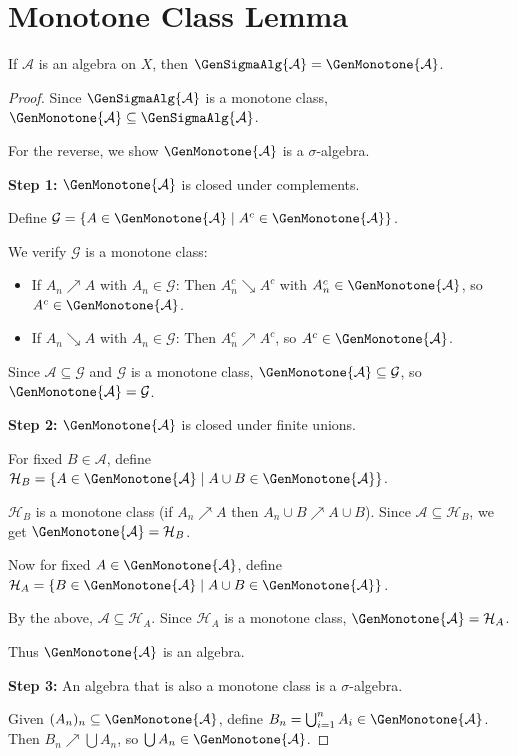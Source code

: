\section{Monotone Class Lemma}

\begin{theorem}
If $\mathcal{A}$ is an algebra on $X$, then $\GenSigmaAlg{\mathcal{A}} = \GenMonotone{\mathcal{A}}$.
\end{theorem}

\begin{proof}
Since $\GenSigmaAlg{\mathcal{A}}$ is a monotone class, $\GenMonotone{\mathcal{A}} \subseteq \GenSigmaAlg{\mathcal{A}}$.

For the reverse, we show $\GenMonotone{\mathcal{A}}$ is a $\sigma$-algebra.

\textbf{Step 1:} $\GenMonotone{\mathcal{A}}$ is closed under complements.

Define $\mathcal{G} = \{A \in \GenMonotone{\mathcal{A}} \mid A^c \in \GenMonotone{\mathcal{A}}\}$.

We verify $\mathcal{G}$ is a monotone class:
\begin{itemize}
    \item If $A_n \nearrow A$ with $A_n \in \mathcal{G}$: Then $A_n^c \searrow A^c$ with $A_n^c \in \GenMonotone{\mathcal{A}}$, so $A^c \in \GenMonotone{\mathcal{A}}$.
    \item If $A_n \searrow A$ with $A_n \in \mathcal{G}$: Then $A_n^c \nearrow A^c$, so $A^c \in \GenMonotone{\mathcal{A}}$.
\end{itemize}

Since $\mathcal{A} \subseteq \mathcal{G}$ and $\mathcal{G}$ is a monotone class, $\GenMonotone{\mathcal{A}} \subseteq \mathcal{G}$, so $\GenMonotone{\mathcal{A}} = \mathcal{G}$.

\textbf{Step 2:} $\GenMonotone{\mathcal{A}}$ is closed under finite unions.

For fixed $B \in \mathcal{A}$, define $\mathcal{H}_B = \{A \in \GenMonotone{\mathcal{A}} \mid A \cup B \in \GenMonotone{\mathcal{A}}\}$.

$\mathcal{H}_B$ is a monotone class (if $A_n \nearrow A$ then $A_n \cup B \nearrow A \cup B$). Since $\mathcal{A} \subseteq \mathcal{H}_B$, we get $\GenMonotone{\mathcal{A}} = \mathcal{H}_B$.

Now for fixed $A \in \GenMonotone{\mathcal{A}}$, define $\mathcal{H}_A = \{B \in \GenMonotone{\mathcal{A}} \mid A \cup B \in \GenMonotone{\mathcal{A}}\}$.

By the above, $\mathcal{A} \subseteq \mathcal{H}_A$. Since $\mathcal{H}_A$ is a monotone class, $\GenMonotone{\mathcal{A}} = \mathcal{H}_A$.

Thus $\GenMonotone{\mathcal{A}}$ is an algebra.

\textbf{Step 3:} An algebra that is also a monotone class is a $\sigma$-algebra.

Given $(A_n)_n \subseteq \GenMonotone{\mathcal{A}}$, define $B_n = \bigcup_{i=1}^n A_i \in \GenMonotone{\mathcal{A}}$. Then $B_n \nearrow \bigcup A_n$, so $\bigcup A_n \in \GenMonotone{\mathcal{A}}$.
\end{proof}


